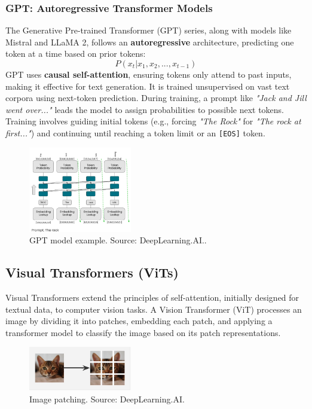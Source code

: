 \subsubsection{GPT: Autoregressive Transformer Models}  
The Generative Pre-trained Transformer (GPT) series, along with models like Mistral and LLaMA 2, follows an \textbf{autoregressive} architecture, predicting one token at a time based on prior tokens:  
\begin{equation}
    P(x_t | x_1, x_2, ..., x_{t-1})
\end{equation}  
GPT uses \textbf{causal self-attention}, ensuring tokens only attend to past inputs, making it effective for text generation. It is trained unsupervised on vast text corpora using next-token prediction. During training, a prompt like \textit{"Jack and Jill went over..."} leads the model to assign probabilities to possible next tokens. Training involves guiding initial tokens (e.g., forcing \textit{"The Rock"} for \textit{"The rock at first..."}) and continuing until reaching a token limit or an \texttt{[EOS]} token.  
\begin{figure}[h]
    \centering
    \includegraphics[width=0.4\textwidth]{IMAGES/immagine_2025-02-26_110808787.png}
    \caption{GPT model example. Source: DeepLearning.AI.\footnotemark.}
    \label{fig:GPT model}
\end{figure}
\subsection{Visual Transformers (ViTs)}

Visual Transformers extend the principles of self-attention, initially designed for textual data, to computer vision tasks. A Vision Transformer (ViT) processes an image by dividing it into patches, embedding each patch, and applying a transformer model to classify the image based on its patch representations.

\begin{figure}[h]
    \centering
    \includegraphics[width=0.4\textwidth]{IMAGES/immagine_2025-02-26_112843716.png}
    \caption{Image patching. Source: DeepLearning.AI.\footnotemark[4]}
    \label{fig: Patching }
\end{figure}

